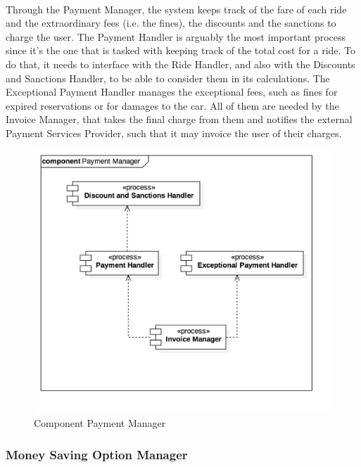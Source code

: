 		\paragraph{} Through the Payment Manager, the system keeps track of the fare of each ride and the extraordinary fees (i.e. the fines), the discounts and the sanctions to charge the user. The Payment Handler is arguably the most important process since it's the one that is tasked with keeping track of the total cost for a ride. To do that, it needs to interface with the Ride Handler, and also with the Discounts and Sanctions Handler, to be able to consider them in its calculations. The Exceptional Payment Handler manages the exceptional fees, such as fines for expired reservations or for damages to the car. All of them are needed by the Invoice Manager, that takes the final charge from them and notifies the external Payment Services Provider, such that it may invoice the user of their charges.
		\begin{figure}[h]
				\includegraphics[scale=0.4, center]{img/component_diagrams/08_payment_manager.png}
				\caption{Component Payment Manager}
			\end{figure}
\FloatBarrier	
		
		
		
		\subsubsection*{Money Saving Option Manager}
			
